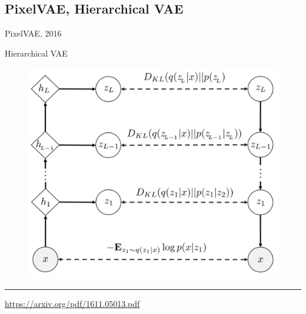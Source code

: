 \documentclass{beamer}
\begin{document}
\subsection{PixelVAE, Hierarchical VAE}
\begin{frame}{PixelVAE, 2016}
	\begin{block}{Hierarchical VAE}
		\begin{figure}
			\centering
			\includegraphics[width=0.7\linewidth]{figs/PixelVAE_1.png}
		\end{figure}
	\end{block}
	\vfill
	\hrule\medskip
	{\scriptsize \href{https://arxiv.org/pdf/1611.05013.pdf}{https://arxiv.org/pdf/1611.05013.pdf}}
\end{frame}
\end{document}
